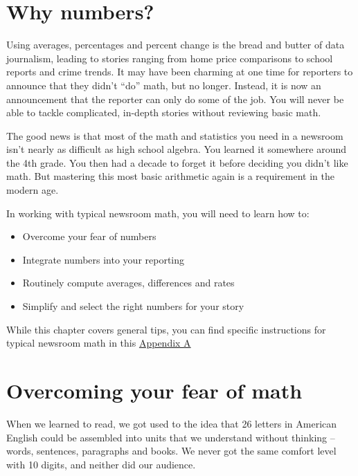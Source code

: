 \documentclass[
  letterpaper,
  DIV=11,
  numbers=noendperiod]{scrreprt}
\providecommand{\tightlist}{%
  \setlength{\itemsep}{0pt}\setlength{\parskip}{0pt}}\usepackage{longtable,booktabs,array}
\begin{document}
\hypertarget{why-numbers}{%
\section{Why numbers?}\label{why-numbers}}

Using averages, percentages and percent change is the bread and butter
of data journalism, leading to stories ranging from home price
comparisons to school reports and crime trends. It may have been
charming at one time for reporters to announce that they didn't ``do''
math, but no longer. Instead, it is now an announcement that the
reporter can only do some of the job. You will never be able to tackle
complicated, in-depth stories without reviewing basic math.

The good news is that most of the math and statistics you need in a
newsroom isn't nearly as difficult as high school algebra. You learned
it somewhere around the 4th grade. You then had a decade to forget it
before deciding you didn't like math. But mastering this most basic
arithmetic again is a requirement in the modern age.

In working with typical newsroom math, you will need to learn how to:

\begin{itemize}
\tightlist
\item
  Overcome your fear of numbers
\item
  Integrate numbers into your reporting
\item
  Routinely compute averages, differences and rates
\item
  Simplify and select the right numbers for your story
\end{itemize}

While this chapter covers general tips, you can find specific
instructions for typical newsroom math in this
\protect\hyperlink{appendix-math}{Appendix A}

\hypertarget{overcoming-your-fear-of-math}{%
\section{Overcoming your fear of
math}\label{overcoming-your-fear-of-math}}

When we learned to read, we got used to the idea that 26 letters in
American English could be assembled into units that we understand
without thinking -- words, sentences, paragraphs and books. We never got
the same comfort level with 10 digits, and neither did our audience.
\end{document}

